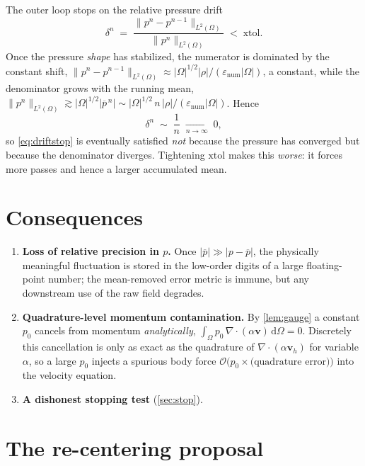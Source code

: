 \documentclass[11pt]{article}
\theoremstyle{plain}
\theoremstyle{remark}
\newcommand{\bv}{\boldsymbol{v}}
\newcommand{\Om}{\Omega}
\newcommand{\meas}{\lvert\Omega\rvert}
\newcommand{\enum}{\varepsilon_{\mathrm{num}}}
\newcommand{\pbar}{\overline{p}}
\newcommand{\norm}[1]{\lVert #1\rVert}
\newcommand{\abs}[1]{\left\lvert #1\right\rvert}
\newcommand{\dx}{\,\mathrm{d}\Omega}
\newcommand{\Ltwo}{L^2(\Omega)}
\begin{document}
The outer loop stops on the relative pressure drift
\begin{equation}
\label{eq:driftstop}
\delta^{n} \;=\; \frac{\norm{p^{n}-p^{n-1}}_{\Ltwo}}{\norm{p^{n}}_{\Ltwo}} \;<\; \mathrm{xtol}.
\end{equation}
Once the pressure \emph{shape} has stabilized, the numerator is dominated by the constant shift,
$\norm{p^{n}-p^{n-1}}_{\Ltwo}\approx\meas^{1/2}\abs{\rho}/(\enum\meas)$, a constant, while the
denominator grows with the running mean, $\norm{p^{n}}_{\Ltwo}\gtrsim\meas^{1/2}\abs{\pbar^{\,n}}
\sim\meas^{1/2}\,n\,\abs{\rho}/(\enum\meas)$. Hence
\begin{equation}
\delta^{n}\;\sim\;\frac{1}{n}\;\xrightarrow[n\to\infty]{}\;0 ,
\end{equation}
so \eqref{eq:driftstop} is eventually satisfied \emph{not} because the pressure has converged but
because the denominator diverges. Tightening $\mathrm{xtol}$ makes this \emph{worse}: it forces more
passes and hence a larger accumulated mean.

\section{Consequences}
\label{sec:consequences}

\begin{enumerate}
\item[(i)] \textbf{Loss of relative precision in $p$.} Once $\abs{\pbar}\gg\abs{p-\pbar}$, the physically
meaningful fluctuation is stored in the low-order digits of a large floating-point number; the
mean-removed error metric is immune, but any downstream use of the raw field degrades.
\item[(ii)] \textbf{Quadrature-level momentum contamination.} By \cref{lem:gauge} a constant $p_0$
cancels from momentum \emph{analytically}, $\int_{\Om}p_0\,\nabla\!\cdot(\alpha\bv)\dx=0$. Discretely
this cancellation is only as exact as the quadrature of $\nabla\!\cdot(\alpha\bv_h)$ for variable
$\alpha$, so a large $p_0$ injects a spurious body force $\mathcal{O}\!\bigl(p_0\times\text{(quadrature
error)}\bigr)$ into the velocity equation.
\item[(iii)] \textbf{A dishonest stopping test} (\cref{sec:stop}).
\end{enumerate}

\section{The re-centering proposal}
\label{sec:fix}
\end{document}
